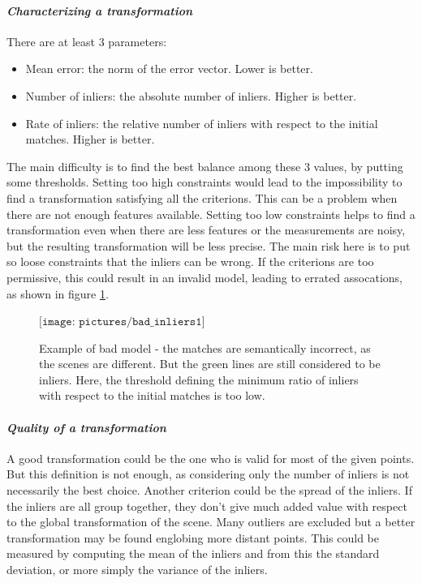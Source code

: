 \clearpage
\paragraph{\emph{Characterizing a transformation}}

There are at least 3 parameters:
\begin{itemize}
\item Mean error: the norm of the error vector. Lower is better.
\item Number of inliers: the absolute number of inliers. Higher is better.
\item Rate of inliers: the relative number of inliers with respect to the initial matches. Higher is better.
\end{itemize}

The main difficulty is to find the best balance among these 3 values, by putting some thresholds. Setting too high constraints would lead to the impossibility to find a transformation satisfying all the criterions. This can be a problem when there are not enough features available. Setting too low constraints helps to find a transformation even when there are less features or the measurements are noisy, but the resulting transformation will be less precise. The main risk here is to put so loose constraints that the inliers can be wrong. If the criterions are too permissive, this could result in an invalid model, leading to errated assocations, as shown in figure \ref{fig:bad_inliers}. 

\begin{figure}[H]
\centering$
\texttt{[image: pictures/bad\_inliers1]}$
\caption{Example of bad model - the matches are semantically incorrect, as the scenes are different. But the green lines are still considered to be inliers. Here, the threshold defining the minimum ratio of inliers with respect to the initial matches is too low.}
\label{fig:bad_inliers}
\end{figure}

\paragraph{\emph{Quality of a transformation}}

A good transformation could be the one who is valid for most of the given points. But this definition is not enough, as considering only the number of inliers is not necessarily the best choice. Another criterion could be the spread of the inliers. If the inliers are all group together, they don't give much added value with respect to the global transformation of the scene. Many outliers are excluded but a better transformation may be found englobing more distant points. This could be measured by computing the mean of the inliers and from this the standard deviation, or more simply the variance of the inliers.

